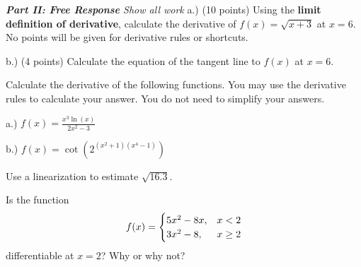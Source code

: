 \documentclass[11pt]{article}
\begin{document}
\begin{questions}
\begin{multiplechoice}{5}
\end{multiplechoice}
\vspace{.2in}

\newpage

\noindent \emph{{\bf Part II: Free Response}{  Show all work}}
\question[14]  a.) (10 points) Using the \textbf{limit definition of derivative}, calculate the derivative of $f(x) = \sqrt{x + 3}$ at $x = 6$.
No points will be given for derivative rules or shortcuts.
\vspace{4.25in}

b.) (4 points) Calculate the equation of the tangent line to $f(x)$ at $x = 6$.


\newpage


\question[20] Calculate the derivative of the following functions. You may use the derivative rules to calculate
your answer. You do not need to simplify your answers.

a.) $\displaystyle f(x) = \frac{x^3 \ln(x)}{2x^2 -3}$
\vspace{3.25in}

b.) $\displaystyle f(x) = \cot(2^{(x^2 + 1)(x^4 - 1)})$
\vspace{3.25in}

\newpage

\question[15]   Use a linearization to estimate $\sqrt{16.3}$.  

\vspace{3.25in}


\question[15] Is the function
$$\begin{displaystyle}
f(x) = \begin{cases}
5x^2 - 8x, & x < 2 \\
3x^2 - 8, & x \ge 2
\end{cases}
\end{displaystyle}
$$
differentiable at $x = 2$? Why or why not?

\mbox{}
\end{questions}
\end{document}
